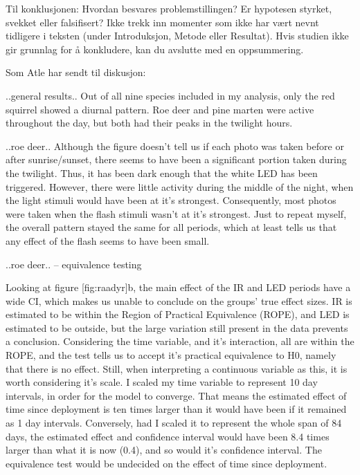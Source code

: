 Til konklusjonen:
Hvordan besvares problemstillingen? Er hypotesen styrket, svekket eller falsifisert? Ikke trekk inn momenter som ikke har vært nevnt tidligere i teksten (under Introduksjon, Metode eller Resultat). Hvis studien ikke gir grunnlag for å konkludere, kan du avslutte med en oppsummering.



Som Atle har sendt til diskusjon:

..general results..
Out of all nine species included in my analysis, only the red squirrel showed a diurnal pattern.
Roe deer and pine marten were active throughout the day, but both had their peaks in the twilight hours. 

..roe deer..
Although the figure doesn’t tell us if each photo was taken before or after sunrise/sunset, there seems to have been a significant portion taken during the twilight. Thus, it has been dark enough that the white LED has been triggered. However, there were little activity during the middle of the night, when the light stimuli would have been at it’s strongest. Consequently, most photos were taken when the flash stimuli wasn’t at it’s strongest.
Just to repeat myself, the overall pattern stayed the same for all periods, which at least tells us that any effect of the flash seems to have been small.


..roe deer.. -- equivalence testing %

Looking at figure [fig:raadyr]b, the main effect of the IR and LED periods have a wide CI, which makes us unable to conclude on the groups’ true effect sizes. IR is estimated to be within the Region of Practical Equivalence (ROPE), and LED is estimated to be outside, but the large variation still present in the data prevents a conclusion. Considering the time variable, and it’s interaction, all are within the ROPE, and the test tells us to accept it’s practical equivalence to H0, namely that there is no effect.
Still, when interpreting a continuous variable as this, it is worth considering it’s scale. I scaled my time variable to represent 10 day intervals, in order for the model to converge. That means the estimated effect of time since deployment is ten times larger than it would have been if it remained as 1 day intervals. Conversely, had I scaled it to represent the whole span of 84 days, the estimated effect and confidence interval would have been 8.4 times larger than what it is now (0.4), and so would it’s confidence interval. The equivalence test would be undecided on the effect of time since deployment.


